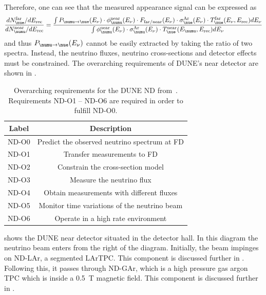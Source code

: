 Therefore, one can see that the measured appearance signal can be expressed as
\begin{equation}
  \frac{ dN_{\nue}^{\text{far}}/dE_{\text{rec}} }{ dN_{\numu}^{\text{near}}/dE_{\text{rec}} } =
  \frac{ \int P_{\numu\rightarrow\nue} (E_{\nu}) \cdot \phi_{\numu}^{\text{near}}(E_{\nu}) \cdot F_{\text{far/near}}(E_{\nu}) \cdot \sigma^{\text{Ar}}_{\nue}(E_{\nu}) \cdot T_{\nue}^{\text{far}}(E_{\nu}, E_{\text{rec}}) dE_{\nu} }{ \int \phi_{\numu}^{\text{near}}(E_{\nu}) \cdot \sigma^{\text{Ar}}_{\numu}(E_{\nu}) \cdot T_{\nue}^{\text{near}}(E_{\numu}, E_{\text{rec}}) dE_{\nu} }
\end{equation}
and thus $P_{\numu\rightarrow\nue} (E_{\nu})$ cannot be easily extracted by taking the ratio of two spectra.
Instead, the neutrino fluxes, neutrino cross-sections and detector effects must be constrained.
The overarching requirements of DUNE's near detector are shown in .

\begin{table}
  \caption[Overarching requirements for the DUNE ND]{Overarching requirements for the DUNE ND from~\cite{ndCdr}. Requirements ND-O1 -- ND-O6 are required in order to fulfill ND-O0.}
  \label{tab:ndReqs}
  \centering
  \begin{tabular}{c c}
    \hline
    \hline
    Label & Description \\
    \hline
    ND-O0 & Predict the observed neutrino spectrum at FD \\
    \hline
    ND-O1 & Transfer measurements to FD \\
    ND-O2 & Constrain the cross-section model \\
    ND-O3 & Measure the neutrino flux \\
    ND-O4 & Obtain measurements with different fluxes \\
    ND-O5 & Monitor time variations of the neutrino beam \\
    ND-O6 & Operate in a high rate environment \\
    \hline
  \end{tabular}
\end{table}

 shows the DUNE near detector situated in the detector hall.
In this diagram the neutrino beam enters from the right of the diagram.
Initially, the beam impinges on ND-LAr, a segmented LArTPC. This component is discussed further in .
Following this, it passes through ND-GAr, which is a high pressure gas argon TPC which is inside a \SI{0.5}{\tesla} magnetic field. This component is discussed further in .

